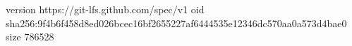 version https://git-lfs.github.com/spec/v1
oid sha256:9f4b6f458d8ed026bcec16bf2655227af6444535e12346dc570aa0a573d4bae0
size 786528
